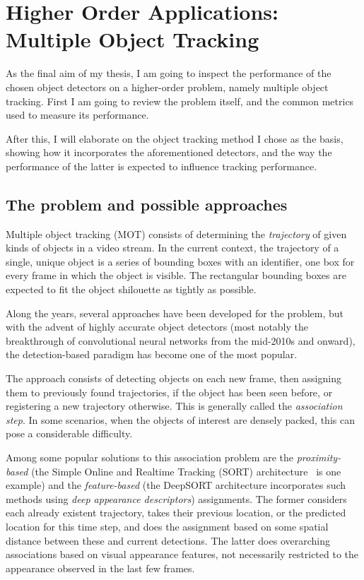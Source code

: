 \chapter{Higher Order Applications: Multiple Object Tracking}

As the final aim of my thesis, I am going to inspect the performance of the chosen object detectors on a higher-order problem, namely multiple object tracking. First I am going to review the problem itself, and the common metrics used to measure its performance. 

After this, I will elaborate on the object tracking method I chose as the basis, showing how it incorporates the aforementioned detectors, and the way the performance of the latter is expected to influence tracking performance.

\section{The problem and possible approaches}

Multiple object tracking (MOT) consists of determining the \textit{trajectory} of given kinds of objects in a video stream. In the current context, the trajectory of a single, unique object is a series of bounding boxes with an identifier, one box for every frame in which the object is visible. The rectangular bounding boxes are expected to fit the object shilouette as tightly as possible.

Along the years, several approaches have been developed for the problem, but with the advent of highly accurate object detectors (most notably the breakthrough of convolutional neural networks from the mid-2010s and onward), the detection-based paradigm has become one of the most popular.

The approach consists of detecting objects on each new frame, then assigning them to previously found trajectories, if the object has been seen before, or registering a new trajectory otherwise. This is generally called the \textit{association step}. In some scenarios, when the objects of interest are densely packed, this can pose a considerable difficulty.

Among some popular solutions to this association problem are the \textit{proximity-based} (the Simple Online and Realtime Tracking (SORT) architecture~\cite{Bewley_2016} is one example) and the \textit{feature-based} (the DeepSORT architecture \cite{DeepSORT} incorporates such methods using \textit{deep appearance descriptors}) assignments. The former considers each already existent trajectory, takes their previous location, or the predicted location for this time step, and does the assignment based on some spatial distance between these and current detections. The latter does overarching associations based on visual appearance features, not necessarily restricted to the appearance observed in the last few frames.


